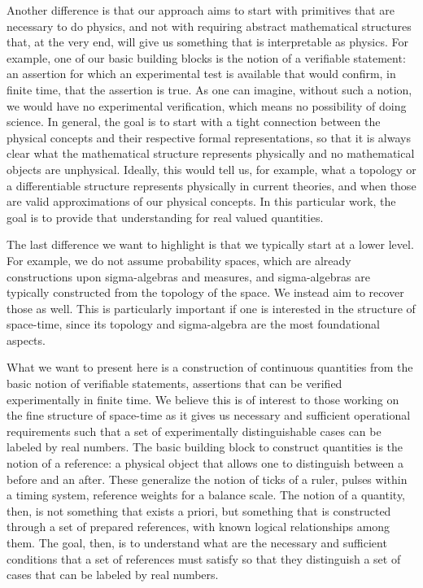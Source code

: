 \documentclass[submission,copyright,creativecommons]{eptcs}
\begin{document}
Another difference is that our approach aims to start with primitives that are necessary to do physics, and not with requiring abstract mathematical structures that, at the very end, will give us something that is interpretable as physics. For example, one of our basic building blocks is the notion of a verifiable statement\cite{Carc2}: an assertion for which an experimental test is available that would confirm, in finite time, that the assertion is true. As one can imagine, without such a notion, we would have no experimental verification, which means no possibility of doing science. In general, the goal is to start with a tight connection between the physical concepts and their respective formal representations, so that it is always clear what the mathematical structure represents physically and no mathematical objects are unphysical. Ideally, this would tell us, for example, what a topology or a differentiable structure represents physically in current theories, and when those are valid approximations of our physical concepts. In this particular work, the goal is to provide that understanding for real valued quantities.

The last difference we want to highlight is that we typically start at a lower level. For example, we do not assume probability spaces, which are already constructions upon sigma-algebras and measures, and sigma-algebras are typically constructed from the topology of the space. We instead aim to recover those as well. This is particularly important if one is interested in the structure of space-time, since its topology and sigma-algebra are the most foundational aspects.

What we want to present here is a construction of continuous quantities from the basic notion of verifiable statements, assertions that can be verified experimentally in finite time. We believe this is of interest to those working on the fine structure of space-time as it gives us necessary and sufficient operational requirements such that a set of experimentally distinguishable cases can be labeled by real numbers. The basic building block to construct quantities is the notion of a reference: a physical object that allows one to distinguish between a before and an after. These generalize the notion of ticks of a ruler, pulses within a timing system, reference weights for a balance scale. The notion of a quantity, then, is not something that exists a priori, but something that is constructed through a set of prepared references, with known logical relationships among them. The goal, then, is to understand what are the necessary and sufficient conditions that a set of references must satisfy so that they distinguish a set of cases that can be labeled by real numbers.
\end{document}
